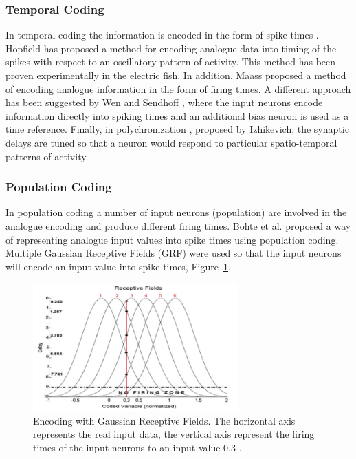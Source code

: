 \subsubsection{Temporal Coding}

In temporal coding the information is encoded in the form of spike times \cite{Bohte:2004:ENI:990372.990380}. Hopfield \cite{hopfield_pattern_1995} has proposed a method for encoding analogue data into timing of the spikes with respect to an oscillatory pattern of activity. This method has been proven experimentally in the electric fish. In addition, Maass \cite{Maass97networksof} proposed a method of encoding analogue information in the form of firing times. A different approach has been suggested by Wen and Sendhoff \cite{Jin:2007:EMO:1776814.1776856}, where the input neurons encode information directly into spiking times and an additional bias neuron is used as a time reference. Finally, in polychronization \cite{Izhikevich:2006:PCS:1117652.1117653}, proposed by Izhikevich,  the synaptic delays are tuned so that a neuron would respond to particular spatio-temporal patterns of activity.

\subsubsection{Population Coding}

In population coding a number of input neurons (population) are involved in the analogue encoding and produce different firing times. Bohte et al. \cite{Bohte02unsupervisedclustering} proposed a way of representing analogue input values into spike times using population coding. Multiple Gaussian Receptive Fields (GRF) were used so that the input neurons will encode an input value into spike times, Figure~\ref{codpop1}.  

\begin{figure}[h!]
\centering
\centering
\includegraphics[width=0.7\textwidth]{chapter2/codpop.png}
	\caption{ Encoding with Gaussian Receptive Fields. The horizontal axis represents the real input data, the vertical axis represent the firing times of the input neurons to an input value 0.3 \cite{Meftah:2010:SED:1873252.1873282}. }
	\label{codpop1}
\end{figure}

